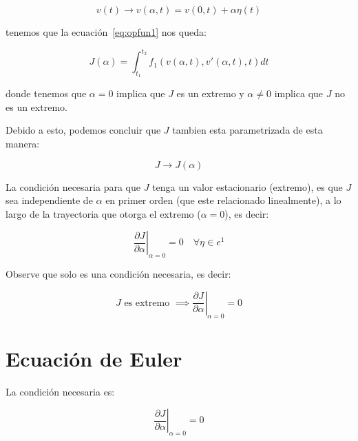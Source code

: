     \begin{equation*}
        v(t) \to v(\alpha, t) = v(0, t) + \alpha \eta(t)
    \end{equation*}

    tenemos que la ecuación~\ref{eq:opfun1} nos queda:

    \begin{equation*}
        J(\alpha) = \int_{t_1}^{t_2} f_1(v(\alpha, t), v'(\alpha, t), t) dt
    \end{equation*}

    donde tenemos que $\alpha = 0$ implica que $J$ es un extremo y $\alpha \ne 0$ implica que $J$ no es un extremo.

    Debido a esto, podemos concluir que $J$ tambien esta parametrizada de esta manera:

    \begin{equation*}
        J \to J(\alpha)
    \end{equation*}

    La condición necesaria para que $J$ tenga un valor estacionario (extremo), es que $J$ sea independiente de $\alpha$ en primer orden (que este relacionado linealmente), a lo largo de la trayectoria que otorga el extremo ($\alpha = 0$), es decir:

    \begin{equation}
        \left. \frac{\partial J}{\partial \alpha} \right|_{\alpha=0} = 0 \quad \forall \eta \in e^1
    \end{equation}

    \begin{nota}
        Observe que solo es una condición necesaria, es decir:

        \begin{equation*}
            J \text{ es extremo } \implies \left. \frac{\partial J}{\partial \alpha} \right|_{\alpha=0} = 0
        \end{equation*}
    \end{nota}

    \newpage
    \section{Ecuación de Euler}

    La condición necesaria es:

    \begin{equation*}
        \left. \frac{\partial J}{\partial \alpha} \right|_{\alpha=0} = 0
    \end{equation*}

